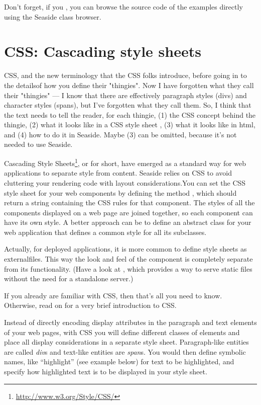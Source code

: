 \documentclass[a4paper,10pt,twoside]{book}
\begin{document}
Don't forget, if you , you can browse the source code of the
examples directly using the Seaside class browser.

\section{CSS: Cascading style sheets}

CSS, and the new terminology that the CSS folks introduce, before going in to the detailsof how you define their "thingies". Now I have forgotten what they call their "thingies"
--- I know that there are effectively paragraph styles (divs) and character styles
(spans), but I've forgotten what they call them. So, I think that the text needs to tell
the reader, for each thingie, (1) the CSS concept behind the thingie, (2) what it looks
like in a CSS style sheet , (3) what it looks like in html, and (4) how to do it in
Seaside. Maybe (3) can be omitted, because it's not needed to use Seaside.

Cascading Style Sheets\footnote{\url{http://www.w3.org/Style/CSS/}}, or  for
short, have emerged as a standard way for web applications to separate style from
content.
Seaside relies on CSS to avoid cluttering your rendering code with layout considerations.You can set the CSS style sheet for your web components by defining the method
, which should return a string containing the CSS rules for that component.
The styles of all the components displayed on a web page are joined together, so each
component can have its own style.
A better approach can be to define an abstract class for your web application that
defines a common style for all its subclasses.

Actually, for deployed applications, it is more common to define style sheets as externalfiles.
This way the look and feel of the component is completely separate from its
functionality.
(Have a look at , which provides a way to serve static files
without the need for a standalone server.)

If you already are familiar with CSS, then that's all you need to know.
Otherwise, read on for a very brief introduction to CSS.

Instead of directly encoding display attributes in the paragraph and text elements of
your web pages, with CSS you will define different classes of elements and place all
display considerations in a separate style sheet.
Paragraph-like entities are called \emph{div}s and text-like entities are \emph{span}s.
You would then define symbolic names, like ``highlight'' (see example below) for text to
be highlighted, and specify how highlighted text is to be displayed in your style sheet.
\end{document}
